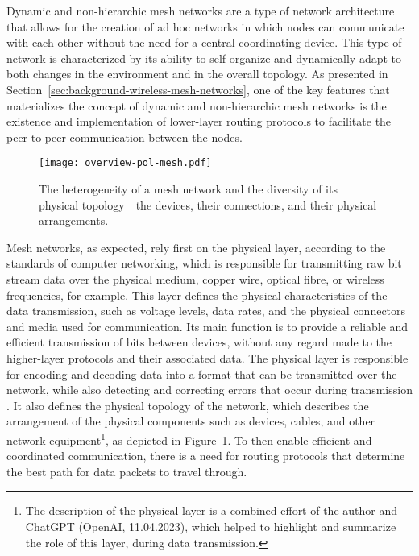 Dynamic and non-hierarchic mesh networks are a type of network architecture that allows for the creation of ad hoc networks in which nodes can communicate with each other without the need for a central coordinating device. This type of network is characterized by its ability to self-organize and dynamically adapt to both changes in the environment and in the overall topology. As presented in Section~\ref{sec:background-wireless-mesh-networks}, one of the key features that materializes the concept of dynamic and non-hierarchic mesh networks is the existence and implementation of lower-layer routing protocols to facilitate the peer-to-peer communication between the nodes.

\begin{figure}[h!]
    \begin{center}
    \texttt{[image: overview-pol-mesh.pdf]}
    \caption{The heterogeneity of a mesh network and the diversity of its physical topology~\textemdash~the devices, their connections, and their physical arrangements.}
    \vspace{-0.5cm}
    \label{fig:proof-of-location-overview-pol-mesh}
    \end{center}
\end{figure}

Mesh networks, as expected, rely first on the physical layer, according to the standards of computer networking, which is responsible for transmitting raw bit stream data over the physical medium, copper wire, optical fibre, or wireless frequencies, for example. This layer defines the physical characteristics of the data transmission, such as voltage levels, data rates, and the physical connectors and media used for communication. Its main function is to provide a reliable and efficient transmission of bits between devices, without any regard made to the higher-layer protocols and their associated data. The physical layer is responsible for encoding and decoding data into a format that can be transmitted over the network, while also detecting and correcting errors that occur during transmission \cite{peterson2007computer}. It also defines the physical topology of the network, which describes the arrangement of the physical components such as devices, cables, and other network equipment\footnote{The description of the physical layer is a combined effort of the author and ChatGPT (OpenAI, 11.04.2023), which helped to highlight and summarize the role of this layer, during data transmission.}, as depicted in Figure~\ref{fig:proof-of-location-overview-pol-mesh}. To then enable efficient and coordinated communication, there is a need for routing protocols that determine the best path for data packets to travel through.

